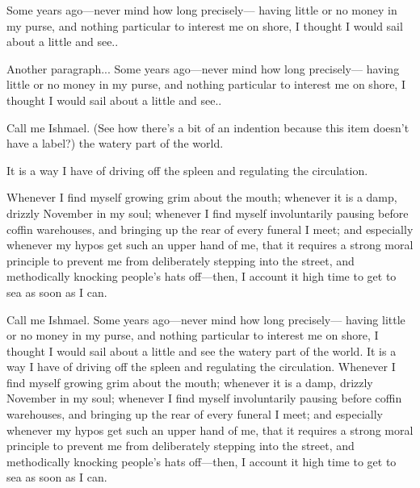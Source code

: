 \documentclass{article}
\begin{document}
\begin{description}
  \item[Label text] Some years ago---never mind how long precisely---
    having little or no money in my purse, and nothing particular to
    interest me on shore, I thought I would sail about a little and see..

    Another paragraph...  Some years ago---never mind how long precisely---
    having little or no money in my purse, and nothing particular to
    interest me on shore, I thought I would sail about a little and see..
   \item Call me Ishmael. (See how there's a bit of an indention because this item doesn't have a label?)
   the watery part of the world.
  \item[Label text] It is a way I have of driving off the
    spleen and regulating the circulation.
  \item[Label text that is long] Whenever I find myself growing grim about the mouth; whenever it is a damp, drizzly
    November in my soul; whenever I find myself involuntarily pausing
    before coffin warehouses, and bringing up the rear of every funeral
    I meet; and especially whenever my hypos get such an upper hand of me,
    that it requires a strong moral principle to prevent me from
    deliberately stepping into the street, and methodically knocking
    people's hats off---then, I account it high time to get to sea as
    soon as I can.
\end{description}

Call me Ishmael.
Some years ago---never mind how long precisely---
having little or no money in my purse, and nothing particular to
interest me on shore, I thought I would sail about a little and see
the watery part of the world.
It is a way I have of driving off the
spleen and regulating the circulation.
Whenever I find myself growing grim about the mouth; whenever it is a damp, drizzly
November in my soul; whenever I find myself involuntarily pausing
before coffin warehouses, and bringing up the rear of every funeral
I meet; and especially whenever my hypos get such an upper hand of me,
that it requires a strong moral principle to prevent me from
deliberately stepping into the street, and methodically knocking
people's hats off---then, I account it high time to get to sea as
soon as I can.
\end{document}
